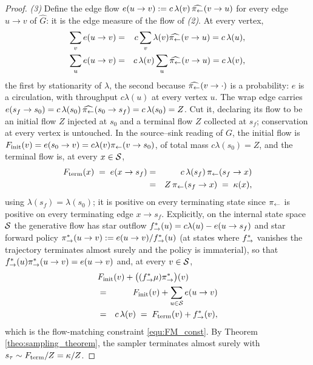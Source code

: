\begin{proof}
\emph{(3)} Define the edge flow $e(u\rightarrow v):= c\,\lambda(v)\,\widehat{\pi_{\leftarrow}}(v\rightarrow u)$ for every edge $u\rightarrow v$ of $\widehat G$: it is the edge measure of the flow of \emph{(2)}. At every vertex,
\begin{eqnarray}
\sum_{v} e(u\rightarrow v) &=& c\sum_v \lambda(v)\widehat{\pi_{\leftarrow}}(v\rightarrow u) = c\,\lambda(u),\nonumber\\
\sum_{u} e(u\rightarrow v) &=& c\,\lambda(v)\sum_u\widehat{\pi_{\leftarrow}}(v\rightarrow u) = c\,\lambda(v),\nonumber
\end{eqnarray}
the first by stationarity of $\lambda$, the second because $\widehat{\pi_{\leftarrow}}(v\rightarrow\cdot)$ is a probability: $e$ is a circulation, with throughput $c\lambda(u)$ at every vertex $u$. The wrap edge carries $e(s_f\rightarrow s_0) = c\,\lambda(s_0)\,\widehat{\pi_{\leftarrow}}(s_0\rightarrow s_f) = c\,\lambda(s_0) = Z$. Cut it, declaring its flow to be an initial flow $Z$ injected at $s_0$ and a terminal flow $Z$ collected at $s_f$; conservation at every vertex is untouched. In the source--sink reading of $G$, the initial flow is $F_{\mathrm{init}}(v) = e(s_0\rightarrow v) = c\lambda(v)\pi_{\leftarrow}(v\rightarrow s_0)$, of total mass $c\lambda(s_0)=Z$, and the terminal flow is, at every $x\in\mathcal S$,
\begin{eqnarray*}
F_{\mathrm{term}}(x) \;=\; e(x\rightarrow s_f) &=& c\,\lambda(s_f)\,\pi_{\leftarrow}(s_f\rightarrow x)\\
&=& Z\,\pi_{\leftarrow}(s_f\rightarrow x) \;=\; \kappa(x),
\end{eqnarray*}
using $\lambda(s_f)=\lambda(s_0)$; it is positive on every terminating state since $\pi_{\leftarrow}$ is positive on every terminating edge $x\rightarrow s_f$. Explicitly, on the internal state space $\mathcal S$ the generative flow has star outflow $f^*_{\rightarrow}(u)= c\lambda(u) - e(u\rightarrow s_f)$ and star forward policy $\pi_{\rightarrow}^*(u\rightarrow v) := e(u\rightarrow v)/f^*_{\rightarrow}(u)$ (at states where $f^*_{\rightarrow}$ vanishes the trajectory terminates almost surely and the policy is immaterial), so that $f^*_{\rightarrow}(u)\pi_{\rightarrow}^*(u\rightarrow v)=e(u\rightarrow v)$ and, at every $v\in\mathcal S$,
\begin{eqnarray*}
\lefteqn{\Finit(v) + \bigl((\foutstar\mu)\ForwardPolicyStar\bigr)(v)}\\
&=& \Finit(v) + \sum_{u \in \Statespace} e(u\rightarrow v)\\
&=& c\,\lambda(v) \;=\; \Fterm(v) + \foutstar(v),
\end{eqnarray*}
which is the flow-matching constraint \eqref{equ:FM_const}. By Theorem \ref{theo:sampling_theorem}, the sampler terminates almost surely with $s_\tau \sim F_{\mathrm{term}}/Z = \kappa/Z$.


\end{proof}
